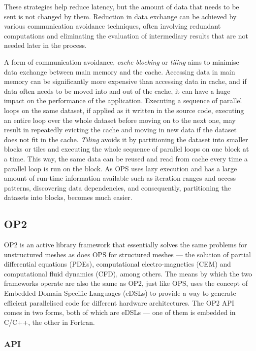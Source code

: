 \documentclass[fontsize=11pt, appendixprefix=true]{scrreprt}
\begin{document}
These strategies help reduce latency, but the amount of data that needs to be
sent is not changed by them. Reduction in data exchange can be achieved by
various communication avoidance techniques, often involving redundant
computations and eliminating the evaluation of intermediary results that are not
needed later in the process.

A form of communication avoidance, \textit{cache blocking} or \textit{tiling}
aims to minimise data exchange between main memory and the cache. Accessing data
in main memory can be significantly more expensive than accessing data in cache,
and if data often needs to be moved into and out of the cache, it can have a
huge impact on the performance of the application. Executing a sequence of
parallel loops on the same dataset, if applied as it written in the source code,
executing an entire loop over the whole dataset before moving on to the next
one, may result in repeatedly evicting the cache and moving in new data if the
dataset does not fit in the cache. \textit{Tiling} avoids it by partitioning the
dataset into smaller blocks or tiles and executing the whole sequence of
parallel loops on one block at a time. This way, the same data can be reused and
read from cache every time a parallel loop is run on the block. As OPS uses lazy
execution and has a large amount of run-time information available such as
iteration ranges and access patterns, discovering data dependencies, and
consequently, partitioning the datasets into blocks, becomes much easier.

\subsection{OP2}

OP2 is an active library framework that essentially solves the same problems for
unstructured meshes as does OPS for structured meshes --- the solution of
partial differential equations (PDEs), computational electro-magnetics (CEM) and
computational fluid dynamics (CFD), among others. The means by which the two
frameworks operate are also the same as OP2, just like OPS, uses the concept of
Embedded Domain Specific Languages (eDSLs) to provide a way to generate
efficient parallelised code for different hardware architectures. The OP2 API
comes in two forms, both of which are eDSLs --- one of them is embedded in
C/C++, the other in Fortran.

\subsubsection{API}
\end{document}
